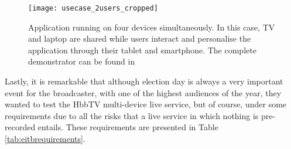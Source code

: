 \begin{figure}
	\texttt{[image: usecase\_2users\_cropped]}
	\caption{Application running on four devices simultaneously. In this case, TV and laptop are shared while users interact and personalise the application through their tablet and smartphone. The complete demonstrator can be found in \cite{vimeo}}
	\label{fig:demo}
\end{figure}

Lastly, it is remarkable that although election day is always a very important event for the broadcaster, with one of the highest audiences of the year, they wanted to test the HbbTV multi-device live service, but of course, under some requirements due to all the risks that a live service in which nothing is pre-recorded entails. These requirements are presented in Table \ref{tab:eitbrequirements}.

